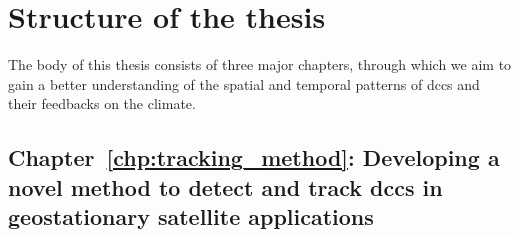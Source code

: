 




\section{Structure of the thesis}

The body of this thesis consists of three major chapters, through which we aim to gain a better understanding of the spatial and temporal patterns of \acrshort{dcc}s and their feedbacks on the climate.


\subsection{Chapter~\ref{chp:tracking_method}: Developing a novel method to detect and track \acrshort{dcc}s in geostationary satellite applications}

